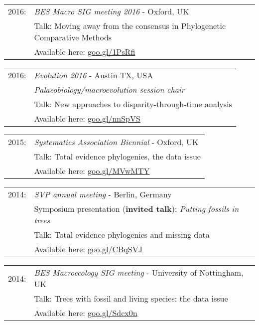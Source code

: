 \documentclass[10pt,a4paper]{article}
\begin{document}
{\begin{tabular}{ll}
2016: & \textit{BES Macro SIG meeting 2016} - Oxford, UK\\
      & Talk: Moving away from the consensus in Phylogenetic Comparative Methods\\
      & Available here: \href{https://figshare.com/articles/Guillerme_BESMacro2016_pdf/3478922}{goo.gl/1PsRfi}\\
\end{tabular}
\begin{tabular}{ll}
2016: & \textit{Evolution 2016} - Austin TX, USA\\
& \textit{Palaeobiology/macroevolution session chair}\\
      & Talk: New approaches to disparity-through-time analysis\\
      & Available here: \href{https://figshare.com/articles/New_approaches_to_disparity-through-time_analysis/3437546}{goo.gl/nnSpVS}\\
\end{tabular}
\begin{tabular}{ll}
2015: & \textit{Systematics Association Biennial} - Oxford, UK\\
      & Talk: Total evidence phylogenies, the data issue\\ 
      & Available here: \href{http://www.slideshare.net/ThomasGuillerme/total-evidence-phylogenies-the-missing-data-issue}{goo.gl/MVwMTY}\\
\end{tabular}
\begin{tabular}{ll}
2014: & \textit{SVP annual meeting} - Berlin, Germany\\
      & Symposium presentation (\textbf{invited talk}): \textit{Putting fossils in trees}\\
      & Talk: Total evidence phylogenies and missing data\\
      & Available here: \href{http://figshare.com/articles/Total_evidence_phylogenies_the_missing_data_issue/1086216}{goo.gl/CBqSVJ}\\
\end{tabular}
\begin{tabular}{ll}
2014: & \textit{BES Macroecology SIG meeting} - University of Nottingham, UK\\
      & Talk: Trees with fossil and living species: the data issue\\ 
      & Available here: \href{http://figshare.com/articles/Trees_with_fossil_and_living_species_the_data_issue/1056307}{goo.gl/Sdcx0n}\\

\end{tabular}}
\end{document}
